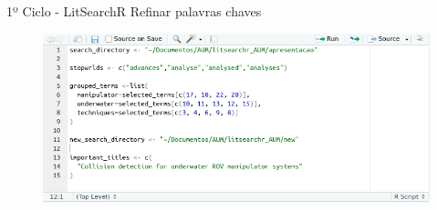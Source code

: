 \begin{frame}{1º Ciclo - LitSearchR}
	Refinar palavras chaves
	\begin{figure}[!ht]
		\includegraphics[width=1\textwidth]{figures/litsearchr/l5.png}
	\end{figure}
\end{frame}